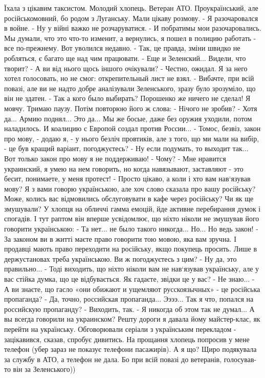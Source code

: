 Їхала з цікавим таксистом. Молодий хлопець. Ветеран АТО. Проукраїнський, але російськомовний, бо родом з Луганську. Мали цікаву розмову. 
- Я разочаровался в войне.
- Ну у війні важко не розчаруватися.
- И побратимы мои разочаровались. Мы думали, что это что-то изменит, а вернулись, я пошел в полицию работать - все по-прежнему. Вот уволился недавно.
- Так, це правда, зміни швидко не робляться, є багато ще над чим працювати. 
- Еще и Зеленский... Видели, что творит?
- А ви від нього щось іншого очікували?
- Честно, ожидал. Я за него хотел голосовать, но не смог: открепительный лист не взял. 
- Вибачте, при всій повазі, але ви не надто добре аналізували Зеленського, зразу було зрозуміло, що він не здатен. 
- Так а кого было выбирать? Порошенко же ничего не сделал!
Я мовчу. Тримаю паузу. Потім повторюю його ж слова:
- Нічого не зробив?
- Хотя да... Армию поднял... Это да... Мы же босые, даже без оружия уходили, потом наладилось. И коалицию с Европой создал против России...
- Томос, безвіз, закон про мову, - додаю я, - у нього безліч провтиків, але з того, що ми мали на вибір, - це був кращий варіант, погоджуєтесь?
- Ну если подумать, то выходит так... Вот только закон про мову я не поддерживаю!
- Чому?
- Мне нравится украинский, я умею на нем говорить, но когда навязывают, заставляют - это бесит, понимаете, у меня протест!
- Просто цікаво, а коли і хто вам нав‘язував мову? Я з вами говорю українською, але хоч слово сказала про вашу російську? Може, колись вас відмовились обслуговувати в кафе через російську? Чи як ще змушували?
У хлопця на обличчі гамма емоцій, йде активне перебирання думок і спогадів. І тут раптом він вперше усвідомлює, що ніхто ніколи не змушував його говорити українською:
- Та нет... не было такого никогда... Но... Но ведь закон!
- За законом ви в житті маєте право говорити тою мовою, яка вам зручна. І продавці мають право переходити на російську, якщо покупець просить. Лише в держустановах треба українською. Ви ж погоджуєтесь з цим?
- Ну да, это правильно...
- Тоді виходить, що ніхто ніколи вам не нав‘язував українську, але у вас стійка думка, що це відбувається. Як гадаєте, звідки це у вас?
- Не знаю...
- А ви знаєте, що гасло «они обижают и ущемляют русскоязычных» - це російська пропаганда?
- Да, точно, российская пропаганда... Ээээ... Так я что, попался на российскую пропаганду?
- Виходить, так.
- Я никогда об этом так не думал... А вы всегда говорили на украинском?
Решту дороги я давала йому майстер-клас, як перейти на українську. Обговорювали серіали з українським перекладом - зацікавився, сказав, спробує дивитись. 
На прощання хлопець попросив у мене телефон (убер зараз не показує телефони пасажирів). А я що? Щиро подякувала за службу в АТО, а телефон не дала. Бо при всій повазі до ветеранів, голосував-то він за Зеленського))

